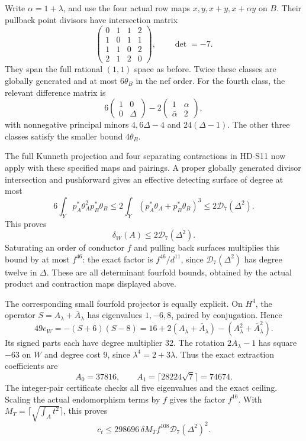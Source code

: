 Write \(\alpha=1+\lambda\), and use the four actual row maps
\(x,y,x+y,x+\alpha y\) on \(B\).
Their pullback point divisors have intersection matrix
\[
 \begin{pmatrix}
 0&1&1&2\\1&0&1&1\\1&1&0&2\\2&1&2&0
 \end{pmatrix},\qquad\det=-7.
\]
They span the full rational \((1,1)\) space as before.
Twice these classes are globally generated and at most
\(6\theta_B\) in the nef order.
For the fourth class, the relevant difference matrix is
\[
 6\begin{pmatrix}1&0\\0&\Delta\end{pmatrix}
 -2\begin{pmatrix}1&\alpha\\\bar\alpha&2\end{pmatrix},
\]
with nonnegative principal minors \(4,6\Delta-4\) and
\(24(\Delta-1)\). The other three classes satisfy the
smaller bound \(4\theta_B\).

The full Kunneth projection and four separating contractions
in HD-S11 now apply with these specified maps and pairings.
A proper globally generated divisor intersection and
pushforward gives an effective detecting surface of degree
at most
\[
 6\int_Yp_A^*\theta_A^2p_B^*\theta_B
 \le2\int_Y(p_A^*\theta_A+p_B^*\theta_B)^3
 \le2\mathcal D_7(\Delta^2).
\]
This proves
\[
 \boxed{\delta_W(A)\le2\mathcal D_7(\Delta^2).}             \tag{S16.1}
\]
Saturating an order of conductor \(f\) and pulling back
surfaces multiplies this bound by at most \(f^{46}\):
the exact factor is \(f^{46}/d^{11}\), since
\(\mathcal D_7(\Delta^2)\) has degree twelve in \(\Delta\).
These are all determinant fourfold bounds, obtained by the
actual product and contraction maps displayed above.

The corresponding small fourfold projector is equally explicit.
On \(H^4\), the operator \(S=A_\lambda+\bar A_\lambda\) has
eigenvalues \(1,-6,8\), paired by conjugation. Hence
\[
 49e_W=-(S+6)(S-8)
      =16+2(A_\lambda+\bar A_\lambda)
           -(A_\lambda^2+\bar A_\lambda^2).
\]
Its signed parts each have degree multiplier \(32\).
The rotation \(2A_\lambda-1\) has square \(-63\) on \(W\)
and degree cost \(9\), since \(\lambda^4=2+3\lambda\).
Thus the exact extraction coefficients are
\[
 A_0=37816,\qquad
 A_1=\lceil28224\sqrt7\rceil=74674.
\]
The integer-pair certificate checks all five eigenvalues and
the exact ceiling. Scaling the actual endomorphism terms by
\(f\) gives the factor \(f^{16}\). With
\(M_T=\lceil\sqrt{\int_A t^2}\rceil\), this proves
\[
 \boxed{c_t\le298696\,\delta M_T f^{108}
                   \mathcal D_7(\Delta^2)^2.}             \tag{S16.2}
\]

